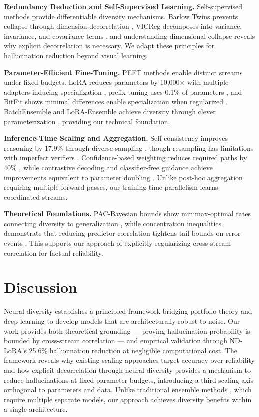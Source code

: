 \documentclass{article} %
\begin{document}
\textbf{Redundancy Reduction and Self-Supervised Learning.}
Self-supervised methods provide differentiable diversity mechanisms. Barlow Twins prevents collapse through
dimension decorrelation \citep{zbontar2021barlow}, VICReg decomposes into variance, invariance, and covariance
terms \citep{bardes2022vicreg}, and understanding dimensional collapse \citep{jing2022dimensional} reveals why
explicit decorrelation is necessary. We adapt these principles for hallucination reduction beyond visual learning.

\textbf{Parameter-Efficient Fine-Tuning.}
PEFT methods enable distinct streams under fixed budgets. LoRA reduces parameters by 10,000× with multiple
adapters inducing specialization \citep{hu2022lora, wang2023loraensemble}, prefix-tuning uses 0.1\% of parameters
\citep{li2021prefix}, and BitFit shows minimal differences enable specialization when regularized
\citep{benzaken2022bitfit}. BatchEnsemble and LoRA-Ensemble achieve diversity through clever parameterization
\citep{wen2020batchensemble, muhlematter2024loraensemble}, providing our technical foundation.

\textbf{Inference-Time Scaling and Aggregation.}
Self-consistency improves reasoning by 17.9\% through diverse sampling \citep{wang2022selfconsistency}, though
resampling has limitations with imperfect verifiers \citep{stroebl2024inference}. Confidence-based weighting
reduces required paths by 40\% \citep{taubenfeld2025confidence}, while contrastive decoding and classifier-free
guidance achieve improvements equivalent to parameter doubling \citep{li2023contrastive, sanchez2023cfg}. Unlike
post-hoc aggregation requiring multiple forward passes, our training-time parallelism learns coordinated streams.

\textbf{Theoretical Foundations.}
PAC-Bayesian bounds show minimax-optimal rates connecting diversity to generalization
\citep{steffen2024misclassification, biggs2022margins, ortega2022diversity}, while concentration inequalities
demonstrate that reducing predictor correlation tightens tail bounds on error events \citep{alquier2024userfriendly}.
This supports our approach of explicitly regularizing cross-stream correlation for factual reliability.

\section{Discussion}
Neural diversity establishes a principled framework bridging portfolio theory and deep learning to develop
models that are architecturally robust to noise. Our work provides both theoretical grounding --- proving
hallucination probability is bounded by cross-stream correlation --- and empirical validation through
ND-LoRA's 25.6\% hallucination reduction at negligible computational cost. The framework reveals why existing
scaling approaches target accuracy over reliability and how explicit decorrelation through neural diversity
provides a mechanism to reduce hallucinations at fixed parameter budgets, introducing a third scaling axis
orthogonal to parameters and data. Unlike traditional ensemble methods \citep{lakshminarayanan2017deep},
which require multiple separate models, our approach achieves diversity benefits within a single architecture.
\end{document}
